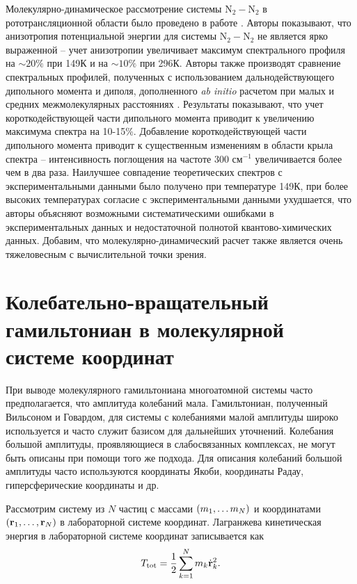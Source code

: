 Молекулярно-динамическое рассмотрение системы N$_2-$N$_2$ в рототрансляционной области было проведено в работе \cite{bussery2014}. Авторы показывают, что анизотропия потенциальной энергии для системы N$_2-$N$_2$ не является ярко выраженной -- учет анизотропии увеличивает максимум спектрального профиля на $\sim 20\%$ при 149К и на $\sim 10\%$ при 296К. Авторы также производят сравнение спектральных профилей, полученных с использованием дальнодействующего дипольного момента и диполя, дополненного \textit{ab initio} расчетом при малых и средних межмолекулярных расстояниях \cite{lokshtanov2008}. Результаты показывают, что учет короткодействующей части дипольного момента приводит к увеличению максимума спектра на 10-15\%. Добавление короткодействующей части дипольного момента приводит к существенным изменениям в области крыла спектра -- интенсивность поглощения на частоте 300 см$^{-1}$ увеличивается более чем в два раза. Наилучшее совпадение теоретических спектров с экспериментальными данными было получено при температуре 149К, при более высоких температурах согласие с экспериментальными данными ухудшается, что авторы объясняют возможными систематическими ошибками в экспериментальных данных и недостаточной полнотой квантово-химических данных. Добавим, что молекулярно-динамический расчет также является очень тяжеловесным с вычислительной точки зрения.

\section{Колебательно-вращательный гамильтониан в молекулярной системе координат}

При выводе молекулярного гамильтониана многоатомной системы часто предполагается, что амплитуда колебаний мала. Гамильтониан, полученный Вильсоном и Говардом, для системы с колебаниями малой амплитуды широко используется и часто служит базисом для дальнейших уточнений. Колебания большой амплитуды, проявляющиеся в слабосвязанных комплексах, не могут быть описаны при помощи того же подхода. Для описания колебаний большой амплитуды часто используются координаты Якоби, координаты Радау, гиперсферические координаты и др. \par 
Рассмотрим систему из $N$ частиц с массами $\left( m_1, \dots m_N \right)$ и координатами $\left( \mathbf{r}_1, \dots, \mathbf{r}_N \right)$ в лабораторной системе координат. Лагранжева кинетическая энергия в лабораторной системе координат записывается как
\begin{gather}
    T_\text{tot} = \frac{1}{2} \sum_{k = 1}^N m_k \dot{\mathbf{r}}_k^2.
\end{gather}

